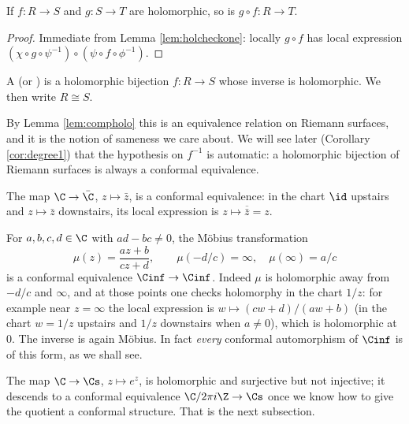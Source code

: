 \begin{lemma}\label{lem:compholo}
	If $f : R \to S$ and $g : S \to T$ are holomorphic, so is $g \circ f : R \to T$.
\end{lemma}

\begin{proof}
	Immediate from Lemma \ref{lem:holcheckone}: locally $g \circ f$ has local expression
	$(\chi \circ g \circ \psi^{-1}) \circ (\psi \circ f \circ \phi^{-1})$.
\end{proof}

\begin{definition}
	A  (or ) is a holomorphic bijection
	$f : R \to S$ whose inverse is holomorphic. We then write $R \cong S$.
\end{definition}

By Lemma \ref{lem:compholo} this is an equivalence relation on Riemann surfaces, and it is
the notion of sameness we care about. We will see later (Corollary \ref{cor:degree1}) that
the hypothesis on $f^{-1}$ is automatic: a holomorphic bijection of Riemann surfaces is
always a conformal equivalence.

\begin{example}
	The map $\C \to \bar\C$, $z \mapsto \bar z$, is a conformal equivalence: in the chart
	$\id$ upstairs and $z \mapsto \bar z$ downstairs, its local expression is
	$z \mapsto \overline{\bar z} = z$.
\end{example}

\begin{example}\label{ex:mobius}
	For $a,b,c,d \in \C$ with $ad - bc \neq 0$, the M\"obius transformation
	$$
	\mu(z) = \frac{az+b}{cz+d}, \qquad \mu(-d/c) = \infty, \quad \mu(\infty) = a/c
	$$
	is a conformal equivalence $\Cinf \to \Cinf$. Indeed $\mu$ is holomorphic away from
	$-d/c$ and $\infty$, and at those points one checks holomorphy in the chart $1/z$: for
	example near $z = \infty$ the local expression is
	$w \mapsto (cw + d)/(aw+b)$ (in the chart $w = 1/z$ upstairs and $1/z$ downstairs when
	$a \ne 0$), which is holomorphic at $0$. The inverse is again M\"obius. In fact
	\emph{every} conformal automorphism of $\Cinf$ is of this form, as we shall see.
\end{example}

\begin{example}
	The map $\C \to \Cs$, $z \mapsto e^z$, is holomorphic and surjective but not injective;
	it descends to a conformal equivalence $\C / 2\pi i \Z \to \Cs$ once we know how to
	give the quotient a conformal structure. That is the next subsection.
\end{example}

